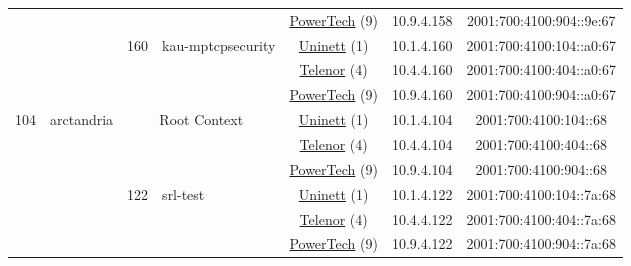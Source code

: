 \begin{small}
\begin{center}
\begin{longtable}{|c|c|c|c|c|c|c|c|}
  &  &  &  & \multicolumn{2}{|c|}{\tiny{\href{http://www.powertech.no}{PowerTech} (9)}} & \tiny{10.9.4.158} & \tiny{2001:700:4100:904::9e:67} \\* \cline{3-3}\cline{4-4}\cline{5-5}\cline{6-6}\cline{7-7}\cline{8-8}
  &  & \multirow{3}{*}{\tiny{160}} & \multicolumn{1}{|l|}{\multirow{3}{*}{\tiny{kau-mptcpsecurity}}} & \multicolumn{2}{|c|}{\tiny{\href{https://www.uninett.no}{Uninett} (1)}} & \tiny{10.1.4.160} & \tiny{2001:700:4100:104::a0:67} \\* \cline{5-5}\cline{6-6}\cline{7-7}\cline{8-8}
  &  &  &  & \multicolumn{2}{|c|}{\tiny{\href{https://www.telenor.no}{Telenor} (4)}} & \tiny{10.4.4.160} & \tiny{2001:700:4100:404::a0:67} \\* \cline{5-5}\cline{6-6}\cline{7-7}\cline{8-8}
  &  &  &  & \multicolumn{2}{|c|}{\tiny{\href{http://www.powertech.no}{PowerTech} (9)}} & \tiny{10.9.4.160} & \tiny{2001:700:4100:904::a0:67} \\ \hline
 \multirow{27}{*}{\tiny{104}} & \multicolumn{1}{|l|}{\multirow{27}{*}{\tiny{arctandria}}} & \multicolumn{2}{|c|}{\multirow{3}{*}{\tiny{Root Context}}} & \multicolumn{2}{|c|}{\tiny{\href{https://www.uninett.no}{Uninett} (1)}} & \tiny{10.1.4.104} & \tiny{2001:700:4100:104::68} \\* \cline{5-5}\cline{6-6}\cline{7-7}\cline{8-8}
  &  & \multicolumn{2}{|c|}{} & \multicolumn{2}{|c|}{\tiny{\href{https://www.telenor.no}{Telenor} (4)}} & \tiny{10.4.4.104} & \tiny{2001:700:4100:404::68} \\* \cline{5-5}\cline{6-6}\cline{7-7}\cline{8-8}
  &  & \multicolumn{2}{|c|}{} & \multicolumn{2}{|c|}{\tiny{\href{http://www.powertech.no}{PowerTech} (9)}} & \tiny{10.9.4.104} & \tiny{2001:700:4100:904::68} \\* \cline{3-3}\cline{4-4}\cline{5-5}\cline{6-6}\cline{7-7}\cline{8-8}
  &  & \multirow{3}{*}{\tiny{122}} & \multicolumn{1}{|l|}{\multirow{3}{*}{\tiny{srl-test}}} & \multicolumn{2}{|c|}{\tiny{\href{https://www.uninett.no}{Uninett} (1)}} & \tiny{10.1.4.122} & \tiny{2001:700:4100:104::7a:68} \\* \cline{5-5}\cline{6-6}\cline{7-7}\cline{8-8}
  &  &  &  & \multicolumn{2}{|c|}{\tiny{\href{https://www.telenor.no}{Telenor} (4)}} & \tiny{10.4.4.122} & \tiny{2001:700:4100:404::7a:68} \\* \cline{5-5}\cline{6-6}\cline{7-7}\cline{8-8}
  &  &  &  & \multicolumn{2}{|c|}{\tiny{\href{http://www.powertech.no}{PowerTech} (9)}} & \tiny{10.9.4.122} & \tiny{2001:700:4100:904::7a:68} \\* \cline{3-3}\cline{4-4}\cline{5-5}\cline{6-6}\cline{7-7}\cline{8-8}

\end{longtable}
\end{center}
\end{small}
